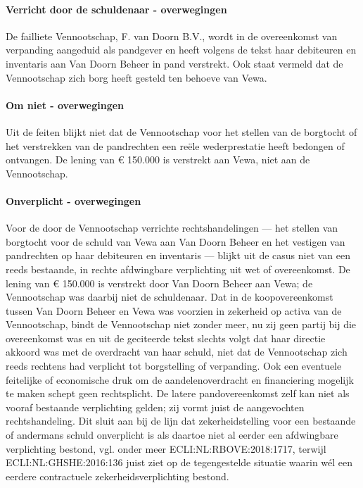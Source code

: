 \documentclass[
  dutch,
  a4paper,
]{article}
\begin{document}
\paragraph{Verricht door de schuldenaar - overwegingen}\label{verricht-door-de-schuldenaar---overwegingen-4}

De failliete Vennootschap, F. van Doorn B.V., wordt in de overeenkomst van verpanding aangeduid als pandgever en heeft volgens de tekst haar debiteuren en inventaris aan Van Doorn Beheer in pand verstrekt. Ook staat vermeld dat de Vennootschap zich borg heeft gesteld ten behoeve van Vewa.

\paragraph{Om niet - overwegingen}\label{om-niet---overwegingen-4}

Uit de feiten blijkt niet dat de Vennootschap voor het stellen van de borgtocht of het verstrekken van de pandrechten een reële wederprestatie heeft bedongen of ontvangen. De lening van € 150.000 is verstrekt aan Vewa, niet aan de Vennootschap.

\paragraph{Onverplicht - overwegingen}\label{onverplicht---overwegingen-4}

Voor de door de Vennootschap verrichte rechtshandelingen --- het stellen van borgtocht voor de schuld van Vewa aan Van Doorn Beheer en het vestigen van pandrechten op haar debiteuren en inventaris --- blijkt uit de casus niet van een reeds bestaande, in rechte afdwingbare verplichting uit wet of overeenkomst. De lening van € 150.000 is verstrekt door Van Doorn Beheer aan Vewa; de Vennootschap was daarbij niet de schuldenaar. Dat in de koopovereenkomst tussen Van Doorn Beheer en Vewa was voorzien in zekerheid op activa van de Vennootschap, bindt de Vennootschap niet zonder meer, nu zij geen partij bij die overeenkomst was en uit de geciteerde tekst slechts volgt dat haar directie akkoord was met de overdracht van haar schuld, niet dat de Vennootschap zich reeds rechtens had verplicht tot borgstelling of verpanding. Ook een eventuele feitelijke of economische druk om de aandelenoverdracht en financiering mogelijk te maken schept geen rechtsplicht. De latere pandovereenkomst zelf kan niet als vooraf bestaande verplichting gelden; zij vormt juist de aangevochten rechtshandeling. Dit sluit aan bij de lijn dat zekerheidstelling voor een bestaande of andermans schuld onverplicht is als daartoe niet al eerder een afdwingbare verplichting bestond, vgl. onder meer ECLI:NL:RBOVE:2018:1717, terwijl ECLI:NL:GHSHE:2016:136 juist ziet op de tegengestelde situatie waarin wél een eerdere contractuele zekerheidsverplichting bestond.
\end{document}
